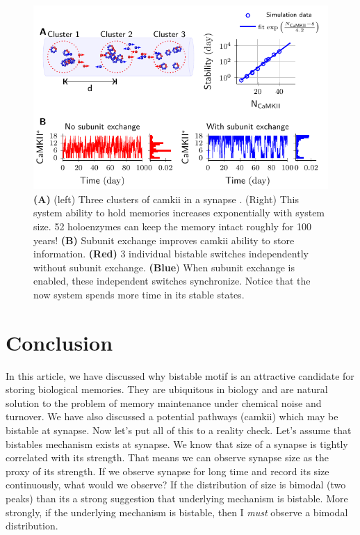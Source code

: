 \documentclass[]{resonance}
\begin{document}
\begin{figure}[t!]
    \caption{ \textbf{(A)} (left) Three clusters of \gls{camkii} in a synapse
        . (Right) This system ability to hold memories increases exponentially
        with system size. 52 holoenzymes can keep the memory intact roughly for
        100 years! \textbf{(B)} Subunit exchange improves \gls{camkii} ability
        to store information. \textbf{(Red)} 3 individual bistable switches independently  
        without subunit exchange. \textbf{(Blue}) When subunit exchange is enabled, these 
        independent switches synchronize. Notice that the now system spends more 
        time in its stable states.
    }\label{fig:camkii_sync}
    \includegraphics[width=\linewidth]{./bistable/Fig5/figure_sync_114mm.pdf}
\end{figure}


\section{Conclusion}

In this article, we have discussed why bistable motif is an attractive candidate
for storing biological memories. They are ubiquitous in biology and are natural
solution to the problem of memory maintenance under chemical noise and turnover.
We have also discussed a potential pathways (\gls{camkii}) which may be bistable
at synapse. Now let's put all of this to a reality check. Let's assume that
bistables mechanism exists at synapse. We know that size of a synapse is tightly
correlated with its strength. That means we can observe synapse size as the
proxy of its strength. If we observe synapse for long time and record its size
continuously, what would we observe? If the distribution of size is bimodal (two
peaks) than its a strong suggestion that underlying mechanism is bistable. More
strongly, if the underlying mechanism is bistable, then I \emph{must} observe a
bimodal distribution.
\end{document}
